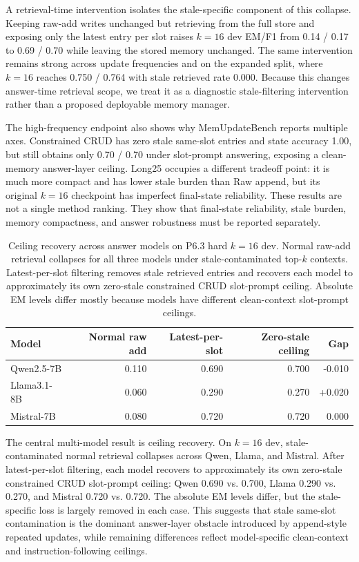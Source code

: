 \documentclass[11pt]{article}
\begin{document}
A retrieval-time intervention isolates the stale-specific component of this collapse. Keeping raw-add writes unchanged but retrieving from the full store and exposing only the latest entry per slot raises \(k=16\) dev EM/F1 from 0.14 / 0.17 to 0.69 / 0.70 while leaving the stored memory unchanged. The same intervention remains strong across update frequencies and on the expanded split, where \(k=16\) reaches 0.750 / 0.764 with stale retrieved rate 0.000. Because this changes answer-time retrieval scope, we treat it as a diagnostic stale-filtering intervention rather than a proposed deployable memory manager.

The high-frequency endpoint also shows why MemUpdateBench reports multiple axes. Constrained CRUD has zero stale same-slot entries and state accuracy 1.00, but still obtains only 0.70 / 0.70 under slot-prompt answering, exposing a clean-memory answer-layer ceiling. Long25 occupies a different tradeoff point: it is much more compact and has lower stale burden than Raw append, but its original \(k=16\) checkpoint has imperfect final-state reliability. These results are not a single method ranking. They show that final-state reliability, stale burden, memory compactness, and answer robustness must be reported separately.

\begin{table}[t]
\centering
\small
\begin{tabular}{lrrrr}
\toprule
Model & Normal raw add & Latest-per-slot & Zero-stale ceiling & Gap \\
\midrule
Qwen2.5-7B & 0.110 & 0.690 & 0.700 & -0.010 \\
Llama3.1-8B & 0.060 & 0.290 & 0.270 & +0.020 \\
Mistral-7B & 0.080 & 0.720 & 0.720 & 0.000 \\
\bottomrule
\end{tabular}
\caption{Ceiling recovery across answer models on P6.3 hard \(k=16\) dev. Normal raw-add retrieval collapses for all three models under stale-contaminated top-\(k\) contexts. Latest-per-slot filtering removes stale retrieved entries and recovers each model to approximately its own zero-stale constrained CRUD slot-prompt ceiling. Absolute EM levels differ mostly because models have different clean-context slot-prompt ceilings.}
\label{tab:ceiling-recovery}
\end{table}

The central multi-model result is ceiling recovery. On \(k=16\) dev, stale-contaminated normal retrieval collapses across Qwen, Llama, and Mistral. After latest-per-slot filtering, each model recovers to approximately its own zero-stale constrained CRUD slot-prompt ceiling: Qwen 0.690 vs. 0.700, Llama 0.290 vs. 0.270, and Mistral 0.720 vs. 0.720. The absolute EM levels differ, but the stale-specific loss is largely removed in each case. This suggests that stale same-slot contamination is the dominant answer-layer obstacle introduced by append-style repeated updates, while remaining differences reflect model-specific clean-context and instruction-following ceilings.
\end{document}
